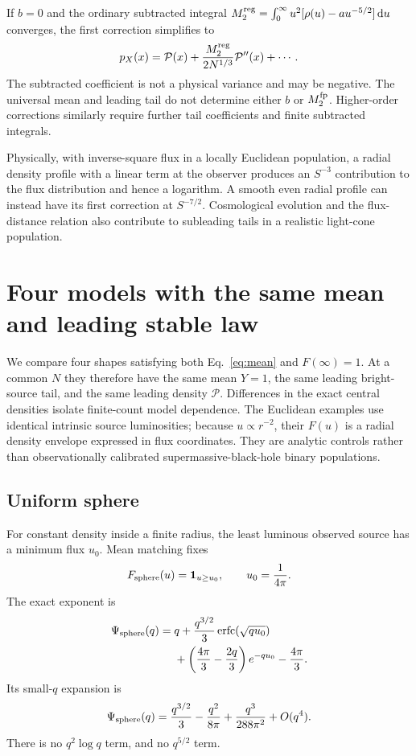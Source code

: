 \documentclass[11pt]{article}
\newcommand{\dd}{\mathrm d}
\newcommand{\erfc}{\operatorname{erfc}}
\newcommand{\Pstable}{\mathcal P}
\begin{document}
If $b=0$ and the ordinary subtracted integral
$M_2^{\rm reg}=\int_0^\infty u^2[\rho(u)-a u^{-5/2}]\,\dd u$ converges,
the first correction simplifies to
\begin{equation}
 p_X(x)=\Pstable(x)
       +\frac{M_2^{\rm reg}}{2N^{1/3}}\Pstable''(x)+\cdots.
 \label{eq:nolog}
\end{equation}
The subtracted coefficient is not a physical variance and may be negative.
The universal mean and leading tail do not determine either $b$ or
$M_2^{\rm fp}$. Higher-order corrections similarly require further tail
coefficients and finite subtracted integrals.

Physically, with inverse-square flux in a locally Euclidean population, a
radial density profile with a linear term at the observer produces an
$S^{-3}$ contribution to the flux distribution and hence a logarithm.
A smooth even radial profile can instead have its first correction at
$S^{-7/2}$. Cosmological evolution and the flux-distance relation also
contribute to subleading tails in a realistic light-cone population.

\section{Four models with the same mean and leading stable law}
\label{sec:models}

We compare four shapes satisfying both Eq.~\eqref{eq:mean} and $F(\infty)=1$.
At a common $N$ they therefore have the same mean $Y=1$, the same leading
bright-source tail, and the same leading density $\Pstable$. Differences in
the exact central densities isolate finite-count model dependence.
The Euclidean examples use identical intrinsic source luminosities; because
$u\propto r^{-2}$, their $F(u)$ is a radial density envelope expressed in
flux coordinates. They are analytic controls rather than observationally
calibrated supermassive-black-hole binary populations.

\subsection{Uniform sphere}
For constant density inside a finite radius, the least luminous observed
source has a minimum flux $u_0$. Mean matching fixes
\begin{equation}
 F_{\rm sphere}(u)=\mathbf1_{u\ge u_0},\qquad u_0=\frac{1}{4\pi}.
\end{equation}
The exact exponent is
\begin{align}
 \Psi_{\rm sphere}(q)={}&q+\frac{q^{3/2}}3\erfc(\sqrt{qu_0})\nonumber\\
 &+\left(\frac{4\pi}{3}-\frac{2q}{3}\right)e^{-qu_0}
 -\frac{4\pi}{3}.
 \label{eq:sphere}
\end{align}
Its small-$q$ expansion is
\begin{equation}
 \Psi_{\rm sphere}(q)=\frac{q^{3/2}}3
 -\frac{q^2}{8\pi}+\frac{q^3}{288\pi^2}+O(q^4).
 \label{eq:sphereexp}
\end{equation}
There is no $q^2\log q$ term, and no $q^{5/2}$ term.
\end{document}
